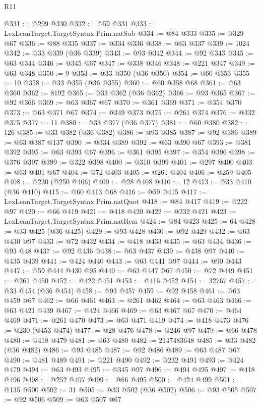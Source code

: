 \begin{lexlean}{R11}
\begin{coremodule}
@331 := @299 @330
@332 := @59 @331
@333 := LexLeanTarget.TargetSyntax.Prim.natSub
@334 := @84 @333
@335 := @329 @67
@336 := @88 @335
@337 := @334 @336
@338 := @63 @337
@339 := 1024
@342 := @33 @339 (@36 @339)
@343 := @93 @342
@344 := @92 @343
@345 := @63 @344
@346 := @345 @67
@347 := @338 @346
@348 := @221 @347
@349 := @63 @348
@350 := 9
@353 := @33 @350 (@36 @350)
@354 := @60 @353
@355 := 10
@358 := @33 @355 (@36 @355)
@360 := @60 @358 @68
@361 := @63 @360
@362 := 8192
@365 := @33 @362 (@36 @362)
@366 := @93 @365
@367 := @92 @366
@369 := @63 @367 @67
@370 := @361 @369
@371 := @354 @370
@373 := @63 @371 @67
@374 := @349 @373
@375 := @261 @374
@376 := @332 @375
@377 := 11
@380 := @33 @377 (@36 @377)
@381 := @60 @380
@382 := 126
@385 := @33 @382 (@36 @382)
@386 := @93 @385
@387 := @92 @386
@389 := @63 @387 @137
@390 := @334 @389
@392 := @63 @390 @67
@393 := @381 @392
@395 := @63 @393 @67
@396 := @361 @395
@397 := @354 @396
@398 := @376 @397
@399 := @322 @398
@400 := @310 @399
@401 := @297 @400
@403 := @63 @401 @67
@404 := @72 @403
@405 := @261 @404
@406 := @259 @405
@408 := @230 (@250 @406)
@409 := @28 @408
@410 := 12
@413 := @33 @410 (@36 @410)
@415 := @60 @413 @68
@416 := @59 @415
@417 := LexLeanTarget.TargetSyntax.Prim.natQuot
@418 := @84 @417
@419 := @222 @97
@420 := @66 @419
@421 := @418 @420
@422 := @232 @421
@423 := LexLeanTarget.TargetSyntax.Prim.natRem
@424 := @84 @423
@425 := 64
@428 := @33 @425 (@36 @425)
@429 := @93 @428
@430 := @92 @429
@432 := @63 @430 @97
@433 := @72 @432
@434 := @418 @433
@435 := @63 @434
@436 := @93 @48
@437 := @92 @436
@438 := @63 @437
@439 := @438 @97
@440 := @435 @439
@441 := @424 @440
@443 := @63 @441 @97
@444 := @90 @443
@447 := @59 @444 @430 @95
@449 := @63 @447 @67
@450 := @72 @449
@451 := @261 @450
@452 := @422 @451
@453 := @416 @452
@454 := 32767
@457 := @33 @454 (@36 @454)
@458 := @93 @457
@459 := @92 @458
@461 := @63 @459 @67
@462 := @66 @461
@463 := @261 @462
@464 := @63 @463
@466 := @63 @421 @439
@467 := @424 @466
@469 := @63 @467 @67
@470 := @464 @469
@471 := @261 @470
@473 := @63 @471 @419
@474 := @418 @473
@476 := @230 (@453 @474)
@477 := @28 @476
@478 := @246 @97
@479 := @66 @478
@480 := @418 @479
@481 := @63 @480
@482 := 2147483648
@485 := @33 @482 (@36 @482)
@486 := @93 @485
@487 := @92 @486
@489 := @63 @487 @67
@490 := @481 @489
@491 := @221 @490
@492 := @232 @491
@493 := @424 @479
@494 := @63 @493
@495 := @345 @97
@496 := @494 @495
@497 := @418 @496
@498 := @252 @497
@499 := @66 @495
@500 := @424 @499
@501 := @135 @500
@502 := 31
@505 := @33 @502 (@36 @502)
@506 := @93 @505
@507 := @92 @506
@509 := @63 @507 @67

\end{coremodule}
\end{lexlean}
